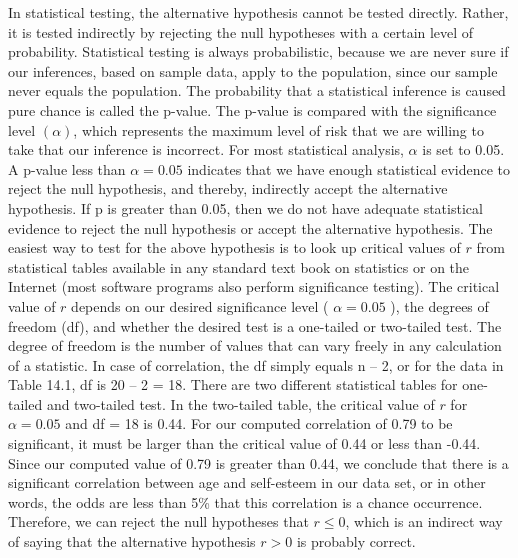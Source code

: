 In statistical testing, the alternative hypothesis cannot be tested directly. Rather, it is tested indirectly by rejecting the null hypotheses with a certain level of probability. Statistical testing is always probabilistic, because we are never sure if our inferences, based on sample data, apply to the population, since our sample never equals the population. The probability that a statistical inference is caused pure chance is called the p-value. The p-value is compared with the significance level $ ( \alpha ) $, which represents the maximum level of risk that we are willing to take that our inference is incorrect. For most statistical analysis, $ \alpha $ is set to 0.05. A p-value less than $ \alpha = 0.05 $ indicates that we have enough statistical evidence to reject the null hypothesis, and thereby, indirectly accept the alternative hypothesis. If p is greater than 0.05, then we do not have adequate statistical evidence to reject the null hypothesis or accept the alternative hypothesis. The easiest way to test for the above hypothesis is to look up critical values of $ r $ from statistical tables available in any standard text book on statistics or on the Internet (most software programs also perform significance testing). The critical value of $ r $ depends on our desired significance level ( $ \alpha = 0.05 $ ), the degrees of freedom (df), and whether the desired test is a one-tailed or two-tailed test. The degree of freedom is the number of values that can vary freely in any calculation of a statistic. In case of correlation, the df simply equals n – 2, or for the data in Table 14.1, df is 20 – 2 = 18. There are two different statistical tables for one-tailed and two-tailed test. In the two-tailed table, the critical value of $ r $ for $ \alpha = 0.05 $ and df = 18 is 0.44. For our computed correlation of 0.79 to be significant, it must be larger than the critical value of 0.44 or less than -0.44. Since our computed value of 0.79 is greater than 0.44, we conclude that there is a significant correlation between age and self-esteem in our data set, or in other words, the odds are less than 5\% that this correlation is a chance occurrence. Therefore, we can reject the null hypotheses that $ r \leq 0 $, which is an indirect way of saying that the alternative hypothesis $ r > 0 $ is probably correct.

